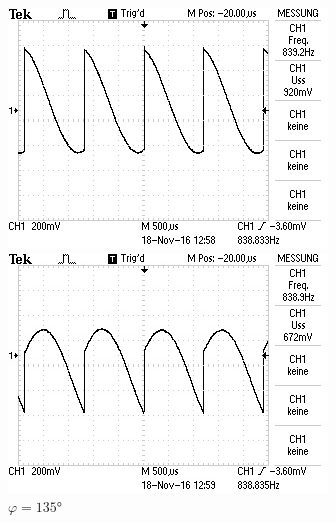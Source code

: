 \begin{figure}[!h]
\begin{minipage}[t]{0.3\textwidth}
\caption{$\varphi = 45\si{\degree}$}
\label{fig:8}
\end{minipage}
\hspace{10pt}
\vspace{5pt}
\begin{minipage}[t]{0.3\textwidth}
\includegraphics[width=\textwidth]{Bilder/Rausch165.jpg}
\caption{$\varphi = 90\si{\degree}$}
\label{fig:9}
\end{minipage}
\hspace{10pt}
\vspace{5pt}
\begin{minipage}[t]{0.3\textwidth}
\includegraphics[width=\textwidth]{Bilder/Rausch240.jpg}
\caption{$\varphi = 135\si{\degree}$}
\label{fig:10}

\end{minipage}
\end{figure}
